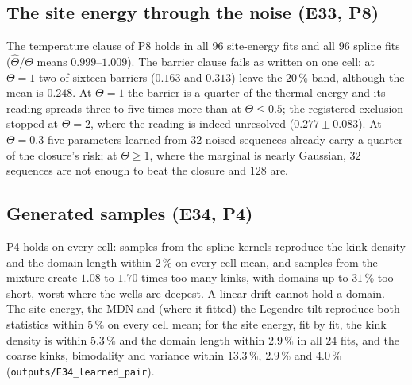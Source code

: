 \documentclass[10pt,a4paper]{article}
\newcommand{\Th}{\Theta}
\newcommand{\code}[1]{\texttt{\small #1}}
\theoremstyle{plain}
\theoremstyle{remark}
\begin{document}
\subsection{The site energy through the noise (E33, P8)}\label{sec:conf-site}

\begin{table}[h]\centering\footnotesize
\caption{\code{em\_pair\_quartic}, risk-selected fits through one noised view per sequence. Middle columns:
$M=2048$, mean over sixteen seeds with the seed spread in brackets; ``band'' counts barriers within
$20\,\%$ of $1/4$ (registered for $\Th\le1$). Right: the score risk as a fraction of the linear floor (E33's
oracles) at each $M$.}
\label{tab:conf-pair}

\end{table}

The temperature clause of P8 holds in all $96$ site-energy fits and all $96$ spline fits ($\hat\Th/\Th$ means
$0.999$--$1.009$). The barrier clause fails as written on one cell: at $\Th=1$ two of sixteen barriers
($0.163$ and $0.313$) leave the $20\,\%$ band, although the mean is $0.248$. At $\Th=1$ the barrier is a
quarter of the thermal energy and its reading spreads three to five times more than at $\Th\le0.5$;
the registered exclusion stopped at $\Th=2$, where the reading is indeed unresolved ($0.277\pm0.083$).
At $\Th=0.3$ five parameters learned from $32$ noised sequences already carry a quarter of the closure's
risk; at $\Th\ge1$, where the marginal is nearly Gaussian, $32$ sequences are not enough to beat the closure
and $128$ are.

\subsection{Generated samples (E34, P4)}

\begin{table}[h]\centering\footnotesize
\caption{Generated over true kink density and mean domain length, $2048$ chains sampled ancestrally from
each risk-selected fit at $M=2048$ (seeds 0--3), mean over the seeds. P4 names the spline (within $15\,\%$) and
the mixture (overshoots the kinks); the other rows are unregistered.}
\label{tab:conf-p4}

\end{table}

P4 holds on every cell: samples from the spline kernels reproduce the kink density and the domain length
within $2\,\%$ on every cell mean, and samples from the mixture create $1.08$ to $1.70$ times too many kinks, with domains up to
$31\,\%$ too short, worst where the wells are deepest. A linear drift cannot hold a domain. The site energy,
the MDN and (where it fitted) the Legendre tilt reproduce both statistics within $5\,\%$ on every cell mean;
for the site energy, fit by fit, the kink density is within $5.3\,\%$ and the domain length within $2.9\,\%$
in all $24$ fits, and the coarse kinks, bimodality and variance within $13.3\,\%$, $2.9\,\%$ and $4.0\,\%$
(\code{outputs/E34\_learned\_pair}).
\end{document}
